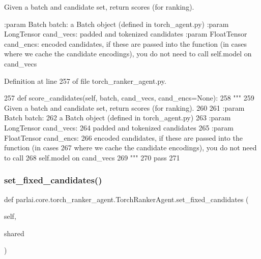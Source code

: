 \begin{DoxyVerb}Given a batch and candidate set, return scores (for ranking).

:param Batch batch:
    a Batch object (defined in torch_agent.py)
:param LongTensor cand_vecs:
    padded and tokenized candidates
:param FloatTensor cand_encs:
    encoded candidates, if these are passed into the function (in cases
    where we cache the candidate encodings), you do not need to call
    self.model on cand_vecs
\end{DoxyVerb}
 

Definition at line 257 of file torch\+\_\+ranker\+\_\+agent.\+py.


\begin{DoxyCode}
257     \textcolor{keyword}{def }score\_candidates(self, batch, cand\_vecs, cand\_encs=None):
258         \textcolor{stringliteral}{"""}
259 \textcolor{stringliteral}{        Given a batch and candidate set, return scores (for ranking).}
260 \textcolor{stringliteral}{}
261 \textcolor{stringliteral}{        :param Batch batch:}
262 \textcolor{stringliteral}{            a Batch object (defined in torch\_agent.py)}
263 \textcolor{stringliteral}{        :param LongTensor cand\_vecs:}
264 \textcolor{stringliteral}{            padded and tokenized candidates}
265 \textcolor{stringliteral}{        :param FloatTensor cand\_encs:}
266 \textcolor{stringliteral}{            encoded candidates, if these are passed into the function (in cases}
267 \textcolor{stringliteral}{            where we cache the candidate encodings), you do not need to call}
268 \textcolor{stringliteral}{            self.model on cand\_vecs}
269 \textcolor{stringliteral}{        """}
270         \textcolor{keywordflow}{pass}
271 
\end{DoxyCode}
\mbox{\label{classparlai_1_1core_1_1torch__ranker__agent_1_1TorchRankerAgent_a9039757596f98b45b6676b16589883a3}} 
\subsubsection{\texorpdfstring{set\+\_\+fixed\+\_\+candidates()}{set\_fixed\_candidates()}}
{\footnotesize\ttfamily def parlai.\+core.\+torch\+\_\+ranker\+\_\+agent.\+Torch\+Ranker\+Agent.\+set\+\_\+fixed\+\_\+candidates (\begin{DoxyParamCaption}\item[{}]{self,  }\item[{}]{shared }\end{DoxyParamCaption})}

